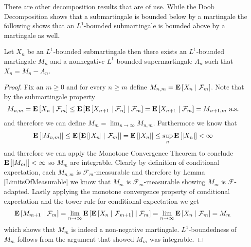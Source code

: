 There are other decomposition results that are of use.  While the Doob
Decomposition shows that a submartingale is bounded below by a
martingale the following shows that an $L^1$-bounded submartingale is
bounded above by a martingale as well.
\begin{lem}\label{KrickebergDecompositionDiscrete}Let $X_n$ be an
  $L^1$-bounded submartingale then there exists an $L^1$-bounded martingale $M_n$ and
  a nonnegative $L^1$-bounded supermartingale $A_n$ such that $X_n = M_n - A_n$.
\end{lem}
\begin{proof}Fix an $m \geq 0$ and for every $n\geq m$ define $M_{n,m}
  = \cexpectationlong{\mathcal{F}_m}{X_n}$.  Note that by the
  submartingale property
\begin{align*}
M_{n,m} &= \cexpectationlong{\mathcal{F}_m}{X_n}  \leq
\cexpectationlong{\mathcal{F}_m}{\cexpectationlong{\mathcal{F}_n}
  {X_{n+1}}} = \cexpectationlong{\mathcal{F}_m}
  {X_{n+1}} = M_{n+1,m} \text{ a.s.}
\end{align*}
and therefore we can define $M_m = \lim_{n \to \infty} M_{n,m}$.
Furthermore we know that 
\begin{align*}
\expectation{\abs{M_{n,m}}} &\leq
\expectation{\cexpectationlong{\mathcal{F}_m}{\abs{X_n}}} 
=\expectation{\abs{X_n}} \leq \sup_n \expectation{\abs{X_n}} < \infty
\end{align*}
and therefore we can apply the Monotone Convergence Theorem to
conclude $\expectation{\abs{M_m}} < \infty$ so $M_m$ are integrable.
Clearly by definition of conditional expectation, each $M_{n,m}$ is $\mathcal{F}_m$-measurable and
therefore by Lemma \ref{LimitsOfMeasurable} we know that $M_m$ is
$\mathcal{F}_m$-measurable showing $M_m$ is $\mathcal{F}$-adapted.
Lastly applying the monotone convergence property of conditional
expectation and the tower rule 
for conditional expectation we get
\begin{align*}
\cexpectationlong{\mathcal{F}_{m}}{M_{m+1}} &= \lim_{n \to \infty}
\cexpectationlong{\mathcal{F}_{m}}{\cexpectationlong{\mathcal{F}_{m+1}}{X_n}}
= \lim_{n \to \infty}\cexpectationlong{\mathcal{F}_{m}}{X_n} = M_m
\end{align*}
which shows that $M_m$ is indeed a non-negative martingale.
$L^1$-boundedness of $M_m$ follows from the argument that showed $M_m$
was integrable.


\end{proof}
